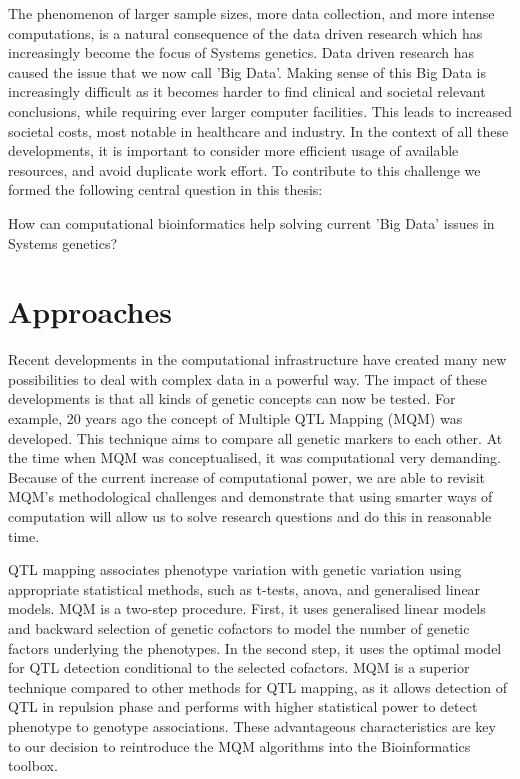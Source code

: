The phenomenon of larger sample sizes, more data collection, and more intense computations, is a natural 
consequence of the data driven research which has increasingly become the focus of Systems genetics. Data 
driven research has caused the issue that we now call 'Big Data'. Making sense of this Big Data is increasingly 
difficult as it becomes harder to find clinical and societal relevant conclusions, while requiring ever 
larger computer facilities. This leads to increased societal costs, most notable in healthcare and industry. 
In the context of all these developments, it is important to consider more efficient usage of available 
resources, and avoid duplicate work effort. To contribute to this challenge we formed the following central 
question in this thesis:

How can computational bioinformatics help solving current 'Big Data' issues in Systems genetics?

\section{Approaches}

Recent developments in the computational infrastructure have created many new possibilities to deal with 
complex data in a powerful way. The impact of these developments is that all kinds of genetic concepts can 
now be tested. For example, 20 years ago the concept of Multiple QTL Mapping (MQM) was developed. This technique 
aims to compare all genetic markers to each other. At the time when MQM was conceptualised, it was computational 
very demanding. Because of the current increase of computational power, we are able to revisit MQM's methodological 
challenges and demonstrate that using smarter ways of computation will allow us to solve research questions and 
do this in reasonable time. 

QTL mapping associates phenotype variation with genetic variation using appropriate statistical methods, such as 
t-tests, anova, and generalised linear models. MQM is a two-step procedure. First, it uses generalised linear models 
and backward selection of genetic cofactors to model the number of genetic factors underlying the phenotypes. In 
the second step, it uses the optimal model for QTL detection conditional to the selected cofactors. MQM is a superior 
technique compared to other methods for QTL mapping, as it allows detection of QTL in repulsion phase and performs 
with higher statistical power to detect phenotype to genotype associations. These advantageous characteristics 
are key to our decision to reintroduce the MQM algorithms into the Bioinformatics toolbox.

